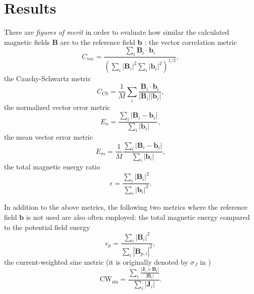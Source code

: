 
\section{Results}

There are \emph{figures of merit} in order to evaluate how similar the calculated magnetic fields $\mathbf{B}$ are to the reference field $\mathbf{b}$ \parencite{schrijver2006nonlinear, metcalf2008nonlinear, yi2022reconstruction}: the vector correlation metric 
\begin{equation*}
  C_\text{vec} = \frac{\sum_i \mathbf{B}_i \cdot \mathbf{b}_i}{(\sum_i |\mathbf{B}_i|^2 \sum_i |\mathbf{b}_i|^2)^{1/2}},
\end{equation*}
the Cauchy-Schwartz metric 
\begin{equation*}
  C_\text{CS} = \frac{1}{M} \sum_i \frac{\mathbf{B}_i \cdot \mathbf{b}_i}{|\mathbf{B}_i||\mathbf{b}_i|},
\end{equation*}
the normalized vector error metric
\begin{equation*}
  E_n = \frac{\sum_i |\mathbf{B}_i - \mathbf{b}_i|}{\sum_i |\mathbf{b}_i|},
\end{equation*}
the mean vector error metric
\begin{equation*}
  E_m = \frac{1}{M} \frac{\sum_i |\mathbf{B}_i - \mathbf{b}_i|}{\sum_i |\mathbf{b}_i|},
\end{equation*}
the total magnetic energy ratio
\begin{equation*}
  \epsilon = \frac{\sum_i |\mathbf{B}_i|^2}{\sum_i |\mathbf{b}_i|^2}.
\end{equation*}

In addition to the above metrics, the following two metrics where the reference field $\mathbf{b}$ is not used are also often employed: the total magnetic energy compared to the potential field energy
\begin{equation*}
  \epsilon_p = \frac{\sum_i |\mathbf{B}_i|^2}{\sum_i |\mathbf{B}_{\text{p}, i}|^2},
\end{equation*}
the current-weighted sine metric (it is originally denoted by $\sigma_J$ in \cite{wheatland2000optimization})
\begin{equation*}
  \text{CW}_\text{sin} = \frac{\sum_i \frac{|\mathbf{J}_i \times \mathbf{B}_i|}{|\mathbf{B}_i|}}{\sum_i |\mathbf{J}_i|}.
\end{equation*}

